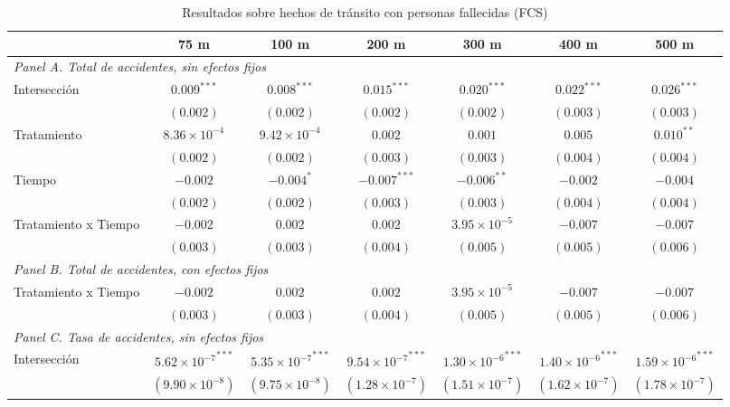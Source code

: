 \begin{table}[htbp]
    \centering
    \caption{Resultados sobre hechos de tránsito con personas fallecidas (FCS)}
    \label{tab:results-main-fcs}
    \footnotesize
    \begin{adjustbox}{max width=\textwidth}
    \begin{tabular}{lcccccc}
        \toprule
        & 75 m & 100 m & 200 m & 300 m & 400 m & 500 m \\
        \midrule
        \multicolumn{7}{l}{\textit{Panel A. Total de accidentes, sin efectos fijos}} \\
        Intersección & ${0.009}^{***}$ & ${0.008}^{***}$ & ${0.015}^{***}$ & ${0.020}^{***}$ & ${0.022}^{***}$ & ${0.026}^{***}$ \\
         & $(0.002)$ & $(0.002)$ & $(0.002)$ & $(0.002)$ & $(0.003)$ & $(0.003)$ \\
        Tratamiento & $8.36 \times 10^{-4}$ & $9.42 \times 10^{-4}$ & $0.002$ & $0.001$ & $0.005$ & ${0.010}^{**}$ \\
         & $(0.002)$ & $(0.002)$ & $(0.003)$ & $(0.003)$ & $(0.004)$ & $(0.004)$ \\
        Tiempo & $-0.002$ & ${-0.004}^{*}$ & ${-0.007}^{***}$ & ${-0.006}^{**}$ & $-0.002$ & $-0.004$ \\
         & $(0.002)$ & $(0.002)$ & $(0.003)$ & $(0.003)$ & $(0.004)$ & $(0.004)$ \\
        Tratamiento x Tiempo & $-0.002$ & $0.002$ & $0.002$ & $3.95 \times 10^{-5}$ & $-0.007$ & $-0.007$ \\
         & $(0.003)$ & $(0.003)$ & $(0.004)$ & $(0.005)$ & $(0.005)$ & $(0.006)$ \\
        \midrule
        \multicolumn{7}{l}{\textit{Panel B. Total de accidentes, con efectos fijos}} \\
        Tratamiento x Tiempo & $-0.002$ & $0.002$ & $0.002$ & $3.95 \times 10^{-5}$ & $-0.007$ & $-0.007$ \\
         & $(0.003)$ & $(0.003)$ & $(0.004)$ & $(0.005)$ & $(0.005)$ & $(0.006)$ \\
        \midrule
        \multicolumn{7}{l}{\textit{Panel C. Tasa de accidentes, sin efectos fijos}} \\
        Intersección & ${5.62 \times 10^{-7}}^{***}$ & ${5.35 \times 10^{-7}}^{***}$ & ${9.54 \times 10^{-7}}^{***}$ & ${1.30 \times 10^{-6}}^{***}$ & ${1.40 \times 10^{-6}}^{***}$ & ${1.59 \times 10^{-6}}^{***}$ \\
         & $(9.90 \times 10^{-8})$ & $(9.75 \times 10^{-8})$ & $(1.28 \times 10^{-7})$ & $(1.51 \times 10^{-7})$ & $(1.62 \times 10^{-7})$ & $(1.78 \times 10^{-7})$ \\

\end{tabular}
\end{adjustbox}
\end{table}
